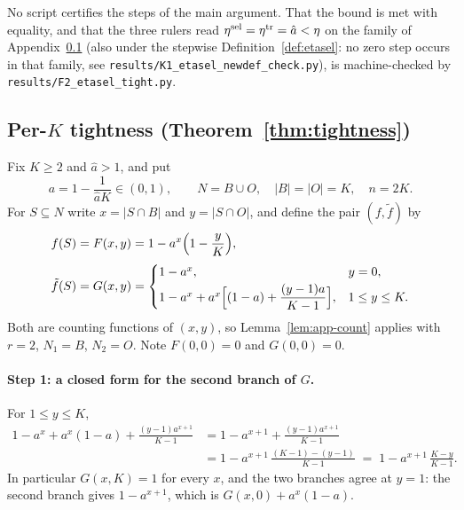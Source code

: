 No script certifies the steps of the main argument.  That the bound is met
with equality, and that the three rulers read $\eta^{\mathrm{sel}}=\eta^{\mathrm{tr}}=\hat a<\eta$
on the family of Appendix~\ref{app:tightness} (also under the stepwise
Definition~\ref{def:etasel}: no zero step occurs in that family, see
\texttt{results/K1\_etasel\_newdef\_check.py}), is machine-checked by
\texttt{results/F2\_etasel\_tight.py}.

\subsection{Per-$K$ tightness (Theorem~\ref{thm:tightness})}\label{app:tightness}

Fix $K\ge2$ and $\hat a>1$, and put
\[
  a=1-\frac{1}{\hat aK}\in(0,1),\qquad N=B\cup O,\quad |B|=|O|=K,\quad n=2K .
\]
For $S\subseteq N$ write $x=|S\cap B|$ and $y=|S\cap O|$, and define the pair
$(f,\tilde f)$ by
\begin{equation}\label{eq:uk-family}
\begin{aligned}
  f(S)&=F(x,y)=1-a^{x}\Bigl(1-\frac yK\Bigr),\\[2pt]
  \tilde f(S)&=G(x,y)=
  \begin{cases}
    1-a^{x}, & y=0,\\[2pt]
    1-a^{x}+a^{x}\Bigl[(1-a)+\dfrac{(y-1)a}{K-1}\Bigr], & 1\le y\le K .
  \end{cases}
\end{aligned}
\end{equation}
Both are counting functions of $(x,y)$, so Lemma~\ref{lem:app-count} applies
with $r=2$, $N_1=B$, $N_2=O$.  Note $F(0,0)=0$ and $G(0,0)=0$.

\paragraph{Step 1: a closed form for the second branch of $G$.}
For $1\le y\le K$,
\begin{align*}
  1-a^{x}+a^{x}(1-a)+\frac{(y-1)a^{x+1}}{K-1}
  &=1-a^{x+1}+\frac{(y-1)a^{x+1}}{K-1}\\
  &=1-a^{x+1}\,\frac{(K-1)-(y-1)}{K-1}
   \;=\;1-a^{x+1}\,\frac{K-y}{K-1}.
\end{align*}
In particular $G(x,K)=1$ for every $x$, and the two branches agree at $y=1$:
the second branch gives $1-a^{x+1}$, which is $G(x,0)+a^{x}(1-a)$.

